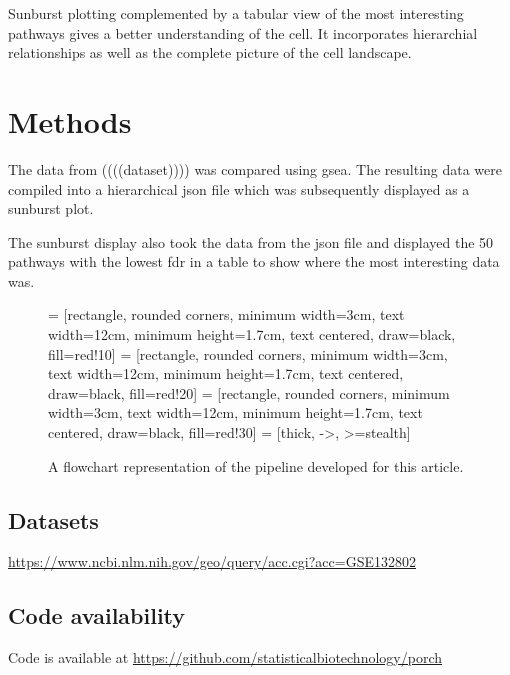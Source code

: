 \documentclass[11pt]{article}
\begin{document}
  Sunburst plotting complemented by a tabular view of the most interesting pathways gives a better understanding of the cell. It incorporates hierarchial relationships as well as the complete picture of the cell landscape.



\section*{Methods}
  The data from ((((dataset)))) was compared using gsea.
  The resulting data were compiled into a hierarchical json file which was subsequently displayed as a sunburst plot.

  The sunburst display also took the data from the json file and displayed the 50 pathways with the lowest fdr in a table to show where the most interesting data was.

  \begin{figure}[t]
    \centering
     = [rectangle, rounded corners, minimum width=3cm, text width=12cm, minimum height=1.7cm, text centered, draw=black, fill=red!10]
     = [rectangle, rounded corners, minimum width=3cm, text width=12cm, minimum height=1.7cm, text centered, draw=black, fill=red!20]
     = [rectangle, rounded corners, minimum width=3cm, text width=12cm, minimum height=1.7cm, text centered, draw=black, fill=red!30]
     = [thick, ->, >=stealth]

  \caption{ A flowchart representation of the pipeline developed for this article.}
  \label{Pipeline flowchart}
\end{figure}

\subsection*{Datasets}
  \url{https://www.ncbi.nlm.nih.gov/geo/query/acc.cgi?acc=GSE132802}
\subsection*{Code availability}
  Code is available at \url{https://github.com/statisticalbiotechnology/porch}
\end{document}
